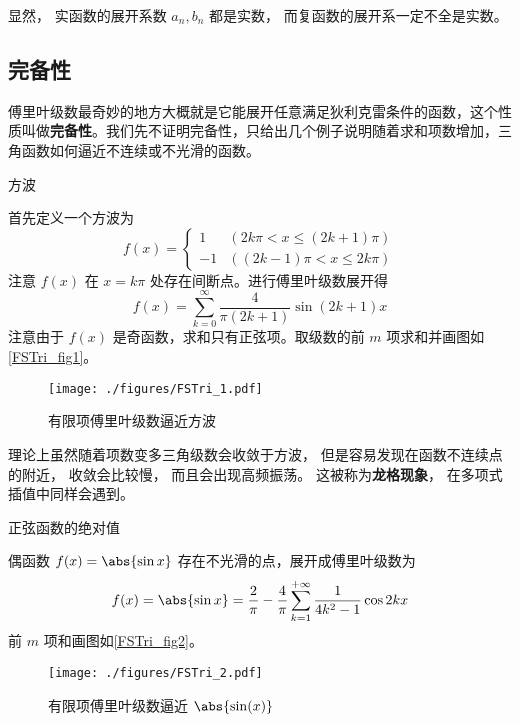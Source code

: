 显然， 实函数的展开系数 $a_n, b_n$ 都是实数， 而复函数的展开系一定不全是实数。

\subsection{完备性}
傅里叶级数最奇妙的地方大概就是它能展开任意满足狄利克雷条件的函数，这个性质叫做\textbf{完备性}。我们先不证明完备性，只给出几个例子说明随着求和项数增加，三角函数如何逼近不连续或不光滑的函数。

\begin{example}{方波}\label{FSTri_ex1}

首先定义一个方波为
\begin{equation}\label{FSTri_eq7}
f(x) = 
\begin{cases}
1  & (2k\pi < x \leqslant (2k + 1)\pi) \\
- 1 &  ((2k - 1)\pi < x \leqslant 2k\pi)
\end{cases}
\end{equation}
注意 $f(x)$ 在 $x=k\pi$ 处存在间断点。进行傅里叶级数展开得
\begin{equation}\label{FSTri_eq5}
f(x) = \sum_{k = 0}^\infty \frac{4}{\pi (2k + 1)}\sin (2k + 1)x
\end{equation}
注意由于 $f(x)$ 是奇函数，求和只有正弦项。取级数的前 $m$ 项求和并画图如\autoref{FSTri_fig1}。

\begin{figure}[ht]
\centering
\texttt{[image: ./figures/FSTri\_1.pdf]}
\caption{有限项傅里叶级数逼近方波}\label{FSTri_fig1}
\end{figure}
理论上虽然随着项数变多三角级数会收敛于方波， 但是容易发现在函数不连续点的附近， 收敛会比较慢， 而且会出现高频振荡。 这被称为\textbf{龙格现象}， 在多项式插值中同样会遇到。
\end{example}

\begin{example}{正弦函数的绝对值}

偶函数 $f(x) = \abs{\sin x}$ 存在不光滑的点，展开成傅里叶级数为
\begin{equation}\label{FSTri_eq6}
f(x) = \abs{\sin x} = \frac{2}{\pi } - \frac{4}{\pi }\sum_{k = 1}^{+\infty} \frac{1}{4 k^2 - 1}\cos 2k x
\end{equation}
前 $m$ 项和画图如\autoref{FSTri_fig2}。
\begin{figure}[ht]
\centering
\texttt{[image: ./figures/FSTri\_2.pdf]}
\caption{有限项傅里叶级数逼近 $\abs{\sin(x)}$}\label{FSTri_fig2}
\end{figure}
\end{example}

